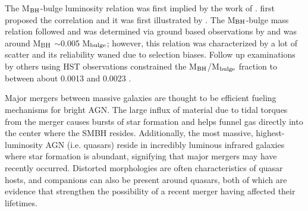 \documentclass[manuscript]{aastex}
\begin{document}



The M$_{\rm BH}$-bulge luminosity relation was first implied by the work of \cite{Dressler1988}. \cite{Dressler1989} first proposed the correlation and it was first illustrated by \cite{Kormendy1993}. The M$_{\rm BH}$-bulge mass relation followed and was determined via ground based observations by \cite{Magorrian1998} and was around M$_{\rm BH}$ $\sim$0.005 M$_{\rm bulge}$; however, this relation was characterized by a lot of scatter and its reliability waned due to selection biases.  Follow up examinations by others using HST observations constrained the M$_{\rm BH}$/M$_{\rm bulge}$ fraction to between about 0.0013 and 0.0023 \citep{Merritt2001a,McLure2001,Marconi2003}. 

Major mergers between massive galaxies are thought to be efficient fueling mechanisms for bright AGN. The large influx of material due to tidal torques from the merger causes bursts of star formation and helps funnel gas directly into the center where the SMBH resides. \citep{Richards2006,Reddy2008,Hopkins2010} Additionally, the most massive, highest-luminosity AGN (i.e. quasars) reside in incredibly luminous infrared galaxies where star formation is abundant, signifying that major mergers may have recently occurred. \citep{Treister2012} Distorted morphologies are often characteristics of quasar hosts, and companions can also be present around quasars, both of which are evidence that strengthen the possibility of a recent merger having affected their lifetimes. 
\end{document}
